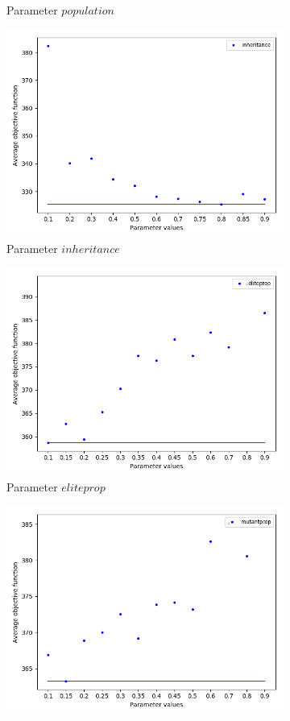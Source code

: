 \begin{figure}[H]
\begin{subfigure}[b]{.49\linewidth}
\caption{Parameter $population$ }\label{fig2b}
\end{subfigure}\vfill
\begin{subfigure}[b]{.49\linewidth}
\centering
\includegraphics[width=0.8\linewidth]{./img/best-inheritance.png}
\caption{Parameter $inheritance$ }\label{fig2c}
\end{subfigure}%
\begin{subfigure}[b]{.49\linewidth}
\centering
\includegraphics[width=0.8\linewidth]{./img/best-eliteprop.png}
\caption{Parameter $eliteprop$ }\label{fig2d}
\end{subfigure}\vfill
\begin{subfigure}[b]{.49\linewidth}
\centering
\includegraphics[width=0.8\linewidth]{./img/best-mutantprop.png}

\end{subfigure}
\end{figure}
